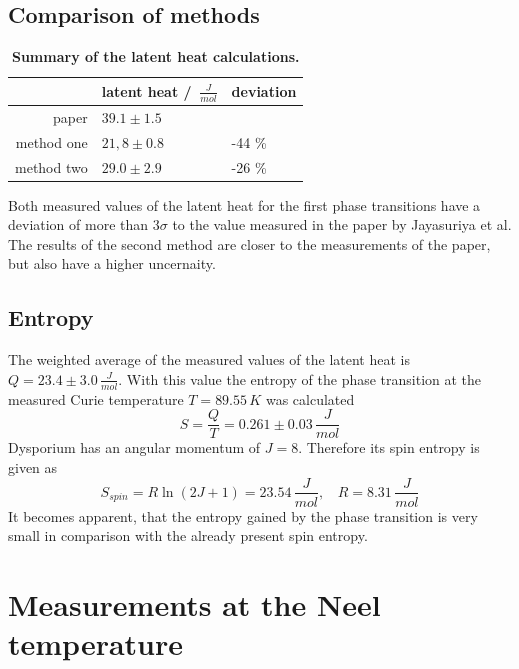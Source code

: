 \documentclass{include/thesisclass3}
\newcommand{\e}[1]{\,\si{#1}}
\begin{document}
\subsection{Comparison of methods}

\begin{table}[H]
\centering
\caption{\label{latentheattable}\textbf{Summary of the latent heat calculations.}}
\begin{tabular}{r|l|l}
 & latent heat / $\e{\frac{J}{mol}}$ & deviation\\
\midrule
paper & $39.1 \pm 1.5$ & \\
method one & $21,8 \pm 0.8$ & -44 \%\\
method two & $29.0 \pm 2.9$ & -26 \%\\
\midrule
\end{tabular}
\end{table}

Both measured values of the latent heat for the first phase transitions have a deviation of more than $3\sigma$ to the value measured in the paper by Jayasuriya et al.\\
The results of the second method are closer to the measurements of the paper, but also have a higher uncernaity. 

\subsection{Entropy}
The weighted average of the measured values of the latent heat is $Q = 23.4 \pm 3.0 \e{\frac{J}{mol}}$. 
With this value the entropy of the phase transition at the measured Curie temperature $T = 89.55\e{K}$ was calculated
\[S = \frac{Q}{T} = 0.261 \pm 0.03\e{\frac{J}{mol}}\]
Dysporium has an angular momentum of $J = 8$. Therefore its spin entropy is given as
\[S_{spin} = R \ln (2J + 1) = 23.54\e{\frac{J}{mol}}, ~~~~ R = 8.31 \e{\frac{J}{mol}}\]
It becomes apparent, that the entropy gained by the phase transition is very small in comparison with the already present spin entropy. 
\section{Measurements at the Neel temperature}
\end{document}
